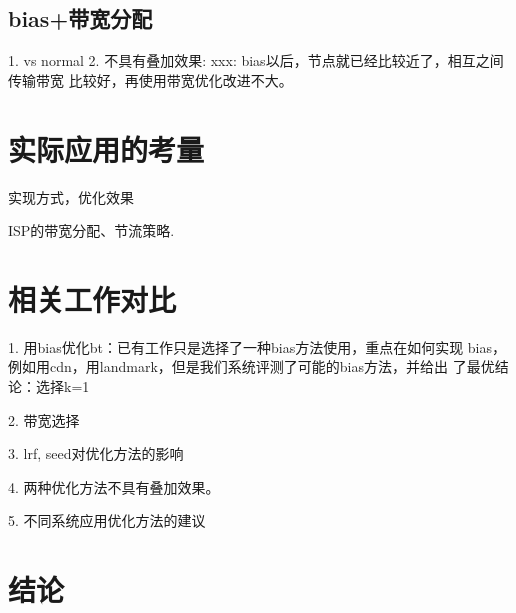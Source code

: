 \subsection{bias+带宽分配}
1. vs normal
2. 不具有叠加效果: xxx: bias以后，节点就已经比较近了，相互之间传输带宽
比较好，再使用带宽优化改进不大。

\section{实际应用的考量}
实现方式，优化效果

ISP的带宽分配、节流策略.

\section{相关工作对比}

1. 用bias优化bt：已有工作只是选择了一种bias方法使用，重点在如何实现
bias，例如用cdn，用landmark，但是我们系统评测了可能的bias方法，并给出
了最优结论：选择k=1

2. 带宽选择

3. lrf, seed对优化方法的影响

4. 两种优化方法不具有叠加效果。

5. 不同系统应用优化方法的建议

\section{结论}
